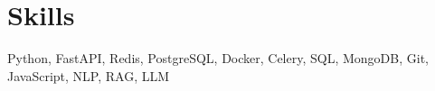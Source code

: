 \section*{Skills}
Python, FastAPI, Redis, PostgreSQL, Docker, Celery, SQL, MongoDB, Git, JavaScript, NLP, RAG, LLM

\vspace{-6.5pt}
